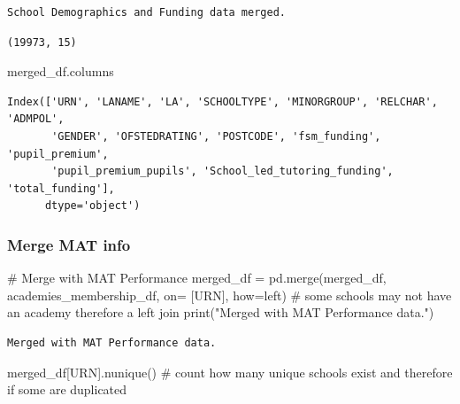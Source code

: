\documentclass[
  letterpaper,
  DIV=11,
  numbers=noendperiod]{scrartcl}
\newenvironment{Shaded}{\begin{snugshade}}{\end{snugshade}}
\newcommand{\BuiltInTok}[1]{\textcolor[rgb]{0.00,0.23,0.31}{#1}}
\newcommand{\CommentTok}[1]{\textcolor[rgb]{0.37,0.37,0.37}{#1}}
\newcommand{\NormalTok}[1]{\textcolor[rgb]{0.00,0.23,0.31}{#1}}
\newcommand{\OperatorTok}[1]{\textcolor[rgb]{0.37,0.37,0.37}{#1}}
\newcommand{\StringTok}[1]{\textcolor[rgb]{0.13,0.47,0.30}{#1}}
\begin{document}
\begin{verbatim}
School Demographics and Funding data merged.
\end{verbatim}

\begin{verbatim}
(19973, 15)
\end{verbatim}

\begin{Shaded}
\begin{Highlighting}[]
\NormalTok{merged\_df.columns}
\end{Highlighting}
\end{Shaded}

\begin{verbatim}
Index(['URN', 'LANAME', 'LA', 'SCHOOLTYPE', 'MINORGROUP', 'RELCHAR', 'ADMPOL',
       'GENDER', 'OFSTEDRATING', 'POSTCODE', 'fsm_funding', 'pupil_premium',
       'pupil_premium_pupils', 'School_led_tutoring_funding', 'total_funding'],
      dtype='object')
\end{verbatim}

\subsubsection{Merge MAT info}\label{merge-mat-info}

\begin{Shaded}
\begin{Highlighting}[]
 \CommentTok{\# Merge with MAT Performance}
\NormalTok{merged\_df }\OperatorTok{=}\NormalTok{ pd.merge(merged\_df, academies\_membership\_df, on}\OperatorTok{=}\NormalTok{ [}\StringTok{\textquotesingle{}URN\textquotesingle{}}\NormalTok{], how}\OperatorTok{=}\StringTok{\textquotesingle{}left\textquotesingle{}}\NormalTok{) }
\CommentTok{\# some schools may not have an academy therefore a left join}
\BuiltInTok{print}\NormalTok{(}\StringTok{"Merged with MAT Performance data."}\NormalTok{)}
\end{Highlighting}
\end{Shaded}

\begin{verbatim}
Merged with MAT Performance data.
\end{verbatim}

\begin{Shaded}
\begin{Highlighting}[]
\NormalTok{merged\_df[}\StringTok{\textquotesingle{}URN\textquotesingle{}}\NormalTok{].nunique() }\CommentTok{\# count how many unique schools exist and therefore if some are duplicated}
\end{Highlighting}
\end{Shaded}
\end{document}
